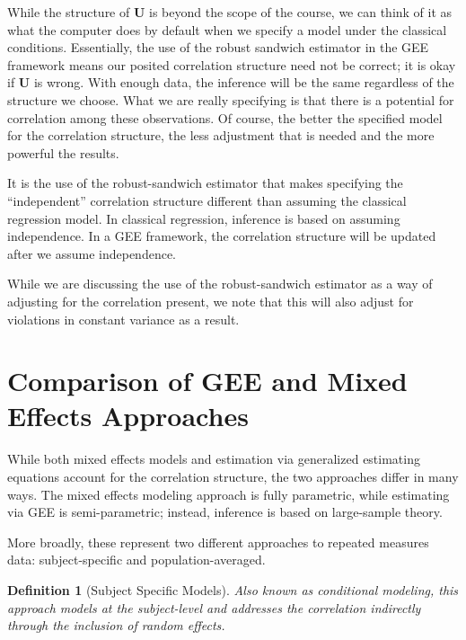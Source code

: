 \documentclass[
]{book}
\theoremstyle{plain}
\theoremstyle{mydefn}
\newtheorem{definition}{Definition}[chapter]
\theoremstyle{myexmpl}
\theoremstyle{remark}
\begin{document}
While the structure of \(\mathbf{U}\) is beyond the scope of the course, we can think of it as what the computer does by default when we specify a model under the classical conditions. Essentially, the use of the robust sandwich estimator in the GEE framework means our posited correlation structure need not be correct; it is okay if \(\mathbf{U}\) is wrong. With enough data, the inference will be the same regardless of the structure we choose. What we are really specifying is that there is a potential for correlation among these observations. Of course, the better the specified model for the correlation structure, the less adjustment that is needed and the more powerful the results.

\begin{rmdtip}
It is the use of the robust-sandwich estimator that makes specifying the ``independent'' correlation structure different than assuming the classical regression model. In classical regression, inference is based on assuming independence. In a GEE framework, the correlation structure will be updated after we assume independence.
\end{rmdtip}

\begin{rmdtip}
While we are discussing the use of the robust-sandwich estimator as a way of adjusting for the correlation present, we note that this will also adjust for violations in constant variance as a result.
\end{rmdtip}

\hypertarget{comparison-of-gee-and-mixed-effects-approaches}{%
\section{Comparison of GEE and Mixed Effects Approaches}\label{comparison-of-gee-and-mixed-effects-approaches}}

While both mixed effects models and estimation via generalized estimating equations account for the correlation structure, the two approaches differ in many ways. The mixed effects modeling approach is fully parametric, while estimating via GEE is semi-parametric; instead, inference is based on large-sample theory.

More broadly, these represent two different approaches to repeated measures data: subject-specific and population-averaged.

\begin{definition}[Subject Specific Models]
Also known as conditional modeling, this approach models at the subject-level and addresses the correlation indirectly through the inclusion of random effects.
\end{definition}
\end{document}
